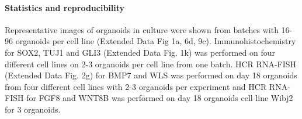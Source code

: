 \paragraph{Statistics and reproducibility}
Representative images of organoids in culture were shown from batches with 16-96 organoids per cell line (Extended Data Fig 1a, 6d, 9c). Immunohistochemistry for SOX2, TUJ1 and GLI3 (Extended Data Fig. 1k) was performed on four different cell lines on 2-3 organoids per cell line from one batch. HCR RNA-FISH (Extended Data Fig. 2g) for BMP7 and WLS was performed on day 18 organoids from four different cell lines with 2-3 organoids per experiment and HCR RNA-FISH for FGF8 and WNT8B was performed on day 18 organoids cell line Wibj2 for 3 organoids.


